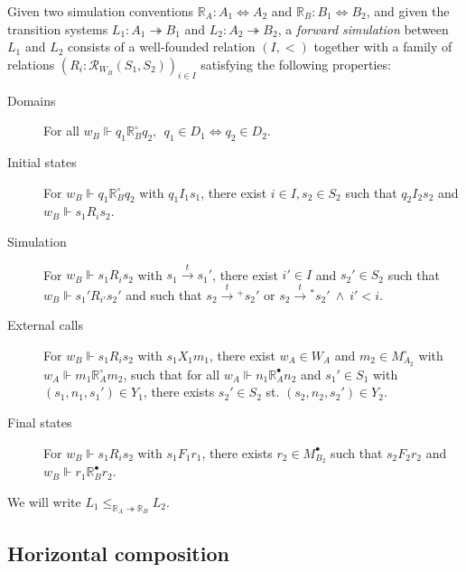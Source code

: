 \documentclass[sigplan,10pt,review,anonymous]{acmart}
\newcommand{\que}{\circ}
\newcommand{\ans}{\bullet}
\begin{document}
\begin{definition} \label{def:sim}
Given
two simulation conventions
$\mathbb{R}_A : A_1 \Leftrightarrow A_2$ and
$\mathbb{R}_B : B_1 \Leftrightarrow B_2$,
and given
the transition systems
$L_1 : A_1 \twoheadrightarrow B_1$ and
$L_2 : A_2 \twoheadrightarrow B_2$,
a \emph{forward simulation} between $L_1$ and $L_2$
consists of a
well-founded relation $(I, <)$
together with a family of relations
$(R_i : \mathcal{R}_{W_B}(S_1, S_2))_{i \in I}$
satisfying the following properties:
\begin{description}
\item[Domains]
  For all
  $w_B \Vdash q_1 \mathrel{\mathbb{R}_B^\que} q_2, \:\:
   q_1 \in D_1 \Leftrightarrow q_2 \in D_2$.
\item[Initial states]
  For
  $w_B \Vdash q_1 \mathrel{\mathbb{R}_B^\que} q_2$
  with $q_1 \mathrel{I_1} s_1$,
  there exist $i \in I, s_2 \in S_2$
  such that $q_2 \mathrel{I_2} s_2$ and
  $w_B \Vdash s_1 \mathrel{R_i} s_2$.
\item[Simulation]
  For $w_B \Vdash s_1 \mathrel{R_i} s_2$
  with $s_1 \stackrel{t}{\rightarrow} s_1'$,
  there exist $i' \in I$ and $s_2' \in S_2$
  such that $w_B \Vdash s_1' \mathrel{R_{i'}} s_2'$ and
  such that
    $s_2 \mathrel{\stackrel{t}{\rightarrow}{\!\!}^+} s_2'$ or
    $s_2 \mathrel{\stackrel{t}{\rightarrow}{\!\!}^*} s_2' \:\wedge\: i' < i$.
\item[External calls]
  For $w_B \Vdash s_1 \mathrel{R_i} s_2$
  with $s_1 \mathrel{X_1} m_1$,
  there exist $w_A \in W_A$ and $m_2 \in M_{A_2}^\que$
  with $w_A \Vdash m_1 \mathrel{\mathbb{R}_A^\que} m_2$,
  such that for all
  $w_A \Vdash n_1 \mathrel{\mathbb{R}_A^\ans} n_2$
  and $s_1' \in S_1$ with $(s_1, n_1, s_1') \in Y_1$,
  there exists $s_2' \in S_2$ st.
  $(s_2, n_2, s_2') \in Y_2$.
\item[Final states]
  For $w_B \Vdash s_1 \mathrel{R_i} s_2$
  with $s_1 \mathrel{F_1} r_1$,
  there exists $r_2 \in M_{B_2}^\ans$ such that
  $s_2 \mathrel{F_2} r_2$ and $w_B \Vdash r_1 \mathrel{\mathbb{R}_B^\ans} r_2$.
\end{description}
We will write $L_1 \le_{\mathbb{R}_A \twoheadrightarrow \mathbb{R}_B} L_2$.
\end{definition}


\subsection{Horizontal composition} \label{sec:sem:linker} %
\end{document}
